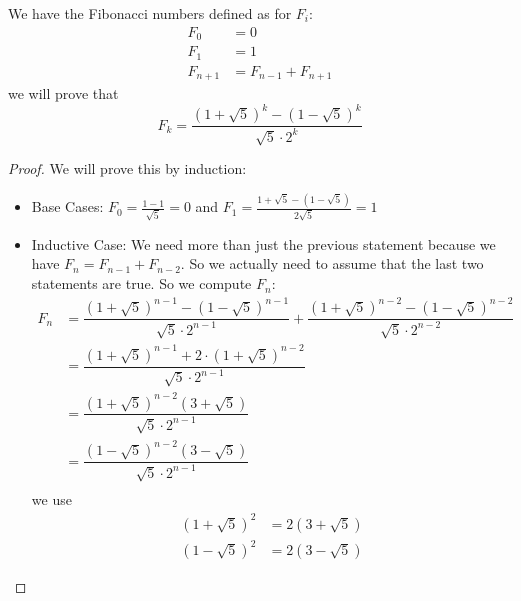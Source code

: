 \documentclass{report}
\begin{document}
\begin{examples}
    \begin{example}
        We have the Fibonacci numbers defined as for $F_{i}$:
            \begin{align*}
                F_{0}     &= 0                     \\
                F_{1}     &= 1                     \\
                F_{n + 1} &= F_{n - 1} + F_{n + 1}   
            \end{align*}
        we will prove that
            \begin{equation*}
                F_{k} = \dfrac{(1 + \sqrt{5})^{k} - (1 - \sqrt{5})^{k}}{\sqrt{5} \cdot 2^{k}}
            \end{equation*}
            \begin{proof}
                We will prove this by induction:
                    \begin{itemize}
                        \item Base Cases: $F_{0} = \frac{1 - 1}{\sqrt{5}} = 0$ and $F_{1} = \frac{1 + \sqrt{5} - (1 - \sqrt{5})}{2 \sqrt{5}} = 1$

                        \item Inductive Case: We need more than just the previous statement because we have $F_{n} = F_{n - 1} + F_{n - 2}$. So we actually need to assume that the last two statements are true. So we compute $F_{n}$:
                            \begin{align*}
                                F_{n} &= \dfrac{(1 + \sqrt{5})^{n - 1} - (1 - \sqrt{5})^{n - 1}}{\sqrt{5} \cdot 2^{n - 1}} + \dfrac{(1 + \sqrt{5})^{n - 2} - (1 - \sqrt{5})^{n - 2}}{\sqrt{5} \cdot 2^{n - 2}} \\
                                    &= \dfrac{(1 + \sqrt{5})^{n - 1} + 2 \cdot (1 + \sqrt{5})^{n - 2}}{\sqrt{5} \cdot 2^{n - 1}} \\
                                    &= \dfrac{(1 + \sqrt{5})^{n - 2}(3 + \sqrt{5})}{\sqrt{5} \cdot 2^{n - 1}} \\
                                    &= \dfrac{(1 - \sqrt{5})^{n - 2}(3 - \sqrt{5})}{\sqrt{5} \cdot 2^{n - 1}} \\
                            \end{align*}
                        we use 
                            \begin{align*}
                                (1 + \sqrt{5})^{2} &= 2(3 + \sqrt{5}) \\
                                (1 - \sqrt{5})^{2} &= 2(3 - \sqrt{5})   
                            \end{align*}
                    \end{itemize}  
            \end{proof}
    \end{example}
\end{examples}
\end{document}

